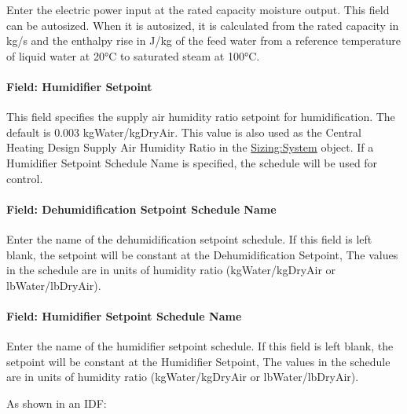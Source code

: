 Enter the electric power input at the rated capacity moisture output. This field can be autosized. When it is autosized, it is calculated from the rated capacity in kg/s and the enthalpy rise in J/kg of the feed water from a reference temperature of liquid water at 20°C to saturated steam at 100°C.

\paragraph{Field: Humidifier Setpoint}\label{field-humidifier-setpoint-4}

This field specifies the supply air humidity ratio setpoint for humidification. The default is 0.003 kgWater/kgDryAir. This value is also used as the Central Heating Design Supply Air Humidity Ratio in the \hyperref[sizingsystem]{Sizing:System} object. If a Humidifier Setpoint Schedule Name is specified, the schedule will be used for control.

\paragraph{Field: Dehumidification Setpoint Schedule Name}\label{field-dehumidification-setpoint-schedule-name}

Enter the name of the dehumidification setpoint schedule. If this field is left blank, the setpoint will be constant at the Dehumidification Setpoint, The values in the schedule are in units of humidity ratio (kgWater/kgDryAir or lbWater/lbDryAir).

\paragraph{Field: Humidifier Setpoint Schedule Name}\label{field-humidifier-setpoint-schedule-name}

Enter the name of the humidifier setpoint schedule. If this field is left blank, the setpoint will be constant at the Humidifier Setpoint, The values in the schedule are in units of humidity ratio (kgWater/kgDryAir or lbWater/lbDryAir).

As shown in an IDF:

